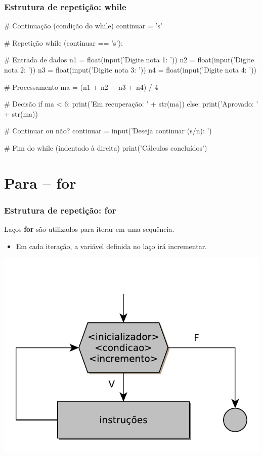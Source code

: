 \documentclass{beamer}
\begin{document}
\begin{frame}[fragile]
    \frametitle{Estrutura de repetição: while}

\begin{python}
# Continuação (condição do while)
continuar = 's'

# Repetição
while (continuar == 's'):
    
    # Entrada de dados
    n1 = float(input('Digite nota 1: '))
    n2 = float(input('Digite nota 2: '))
    n3 = float(input('Digite nota 3: '))
    n4 = float(input('Digite nota 4: '))

    # Processamento
    ma = (n1 + n2 + n3 + n4) / 4
    
    # Decisão
    if ma < 6:
        print('Em recuperação: ' + str(ma))
    else:
        print('Aprovado: ' + str(ma))

    # Continuar ou não?
    continuar = input('Deseja continuar (s/n): ')

# Fim do while (indentado à direita)
print('Cálculos concluídos')
\end{python}  
\end{frame}   

\section{Para -- for}

\begin{frame}
    \frametitle{Estrutura de repetição: for}
 
    \vspace{-1cm}

    \vfill\begin{block}{}
    Laços \textbf{for} são utilizados para iterar em uma sequência. 
    \end{block}

    \vfill \begin{itemize}
    \item Em cada iteração, a variável definida no laço irá incrementar.
    \end{itemize}

    \vfill \center \includegraphics[scale=0.35]{./figures/for-simple.pdf}
 
\end{frame}
\end{document}
